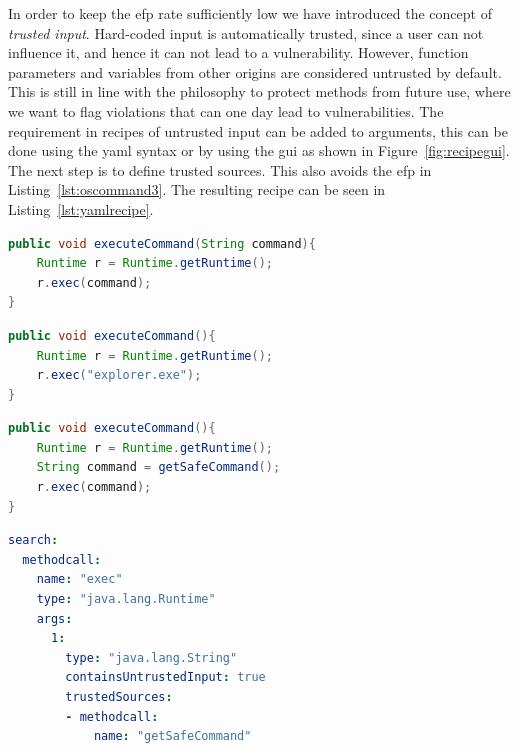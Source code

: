 In order to keep the \gls{efp} rate sufficiently low we have introduced the concept of \emph{trusted input}.
Hard-coded input is automatically trusted, since a user can not influence it, and hence it can not lead to a vulnerability.
However, function parameters and variables from other origins are considered untrusted by default.
This is still in line with the philosophy to protect methods from future use, where we want to flag violations that can one day lead to vulnerabilities.
The requirement in recipes of untrusted input can be added to arguments, this can be done using the \gls{yaml} syntax or by using the \gls{gui} as shown in Figure~\ref{fig:recipegui}. 
The next step is to define trusted sources. This also avoids the \gls{efp} in Listing~\ref{lst:oscommand3}. The resulting recipe can be seen in Listing~\ref{lst:yamlrecipe}.

\begin{minipage}[t]{0.9\linewidth}
\begin{lstlisting}[language={Java},caption={if the \texttt{command} variable contains unsanitized user input, this function is vulnerable to \gls{os} command injection.},label={lst:oscommand1},abovecaptionskip=-0.0pt,xleftmargin=15pt]
public void executeCommand(String command){
    Runtime r = Runtime.getRuntime();
    r.exec(command);
}
\end{lstlisting}
\begin{lstlisting}[language={Java},caption={Using a hard-coded command avoids the possibility that the variable will ever contain unsanitized user input.},label={lst:oscommand2},abovecaptionskip=-0.0pt,xleftmargin=15pt]
public void executeCommand(){
    Runtime r = Runtime.getRuntime();
    r.exec("explorer.exe");
}
\end{lstlisting}

\begin{lstlisting}[language={Java},caption={This code fragment is secure if the \texttt{getSafeCommand} method can be trusted to never return variables containing unsanitized user input.},label={lst:oscommand3},abovecaptionskip=-0.0pt,xleftmargin=15pt]
public void executeCommand(){
    Runtime r = Runtime.getRuntime();
    String command = getSafeCommand();
    r.exec(command);
}
\end{lstlisting}

\begin{lstlisting}[language={yaml},caption={This recipe trigger requires the argument of an \texttt{exec} methodcall to contain untrusted input before it will mark the methodcall. It also specifies the methodcall \texttt{getSafeCommand} as a trusted source of input.},label={lst:yamlrecipe},xleftmargin=15pt]
search:
  methodcall:
    name: "exec"
    type: "java.lang.Runtime"
    args:
      1:
        type: "java.lang.String"
        containsUntrustedInput: true
        trustedSources:
        - methodcall:
            name: "getSafeCommand"
\end{lstlisting}
\end{minipage}

